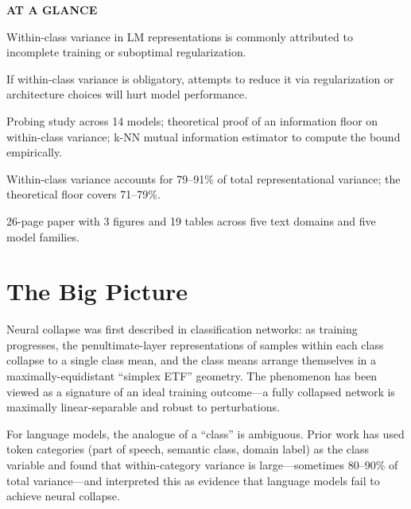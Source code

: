 \documentclass[10pt,twocolumn]{article}
\begin{document}
\begin{mdframed}[backgroundcolor=boxgray,linecolor=rulered,linewidth=1pt,
    innerleftmargin=6pt,innerrightmargin=6pt,
    innertopmargin=6pt,innerbottommargin=6pt]
\textbf{\small AT A GLANCE}\par\vspace{4pt}
\begin{description}[leftmargin=0pt,labelsep=4pt,itemsep=2pt,parsep=0pt,
    font=\small\bfseries]
  \item[Problem:] Within-class variance in LM representations is
    commonly attributed to incomplete training or suboptimal
    regularization.
  \item[Why it matters:] If within-class variance is obligatory, attempts
    to reduce it via regularization or architecture choices will hurt
    model performance.
  \item[Method:] Probing study across 14 models; theoretical proof of
    an information floor on within-class variance; k-NN mutual information
    estimator to compute the bound empirically.
  \item[Result:] Within-class variance accounts for 79--91\% of total
    representational variance; the theoretical floor covers 71--79\%.
  \item[Evidence:] 26-page paper with 3 figures and 19 tables across
    five text domains and five model families.
\end{description}
\end{mdframed}

\section{The Big Picture}

Neural collapse was first described in classification networks: as
training progresses, the penultimate-layer representations of samples
within each class collapse to a single class mean, and the class means
arrange themselves in a maximally-equidistant ``simplex ETF'' geometry.
The phenomenon has been viewed as a signature of an ideal training
outcome---a fully collapsed network is maximally linear-separable and
robust to perturbations.

For language models, the analogue of a ``class'' is ambiguous. Prior
work has used token categories (part of speech, semantic class, domain
label) as the class variable and found that within-category variance
is large---sometimes 80--90\% of total variance---and interpreted this
as evidence that language models fail to achieve neural collapse.
\end{document}

